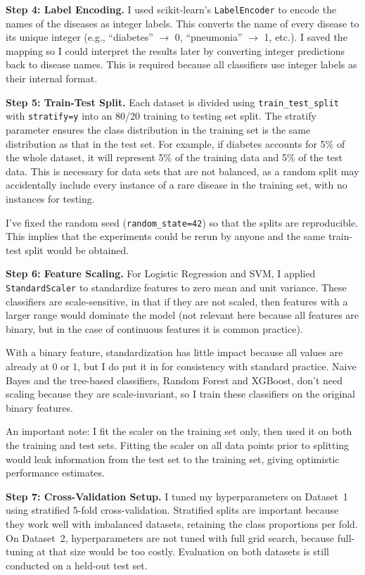 \textbf{Step 4: Label Encoding.} I used scikit-learn's \texttt{LabelEncoder} to encode the names of the diseases as integer labels. This converts the name of every disease to its unique integer (e.g., ``diabetes'' $\rightarrow$ 0, ``pneumonia'' $\rightarrow$ 1, etc.). I saved the mapping so I could interpret the results later by converting integer predictions back to disease names. This is required because all classifiers use integer labels as their internal format.

\textbf{Step 5: Train-Test Split.} Each dataset is divided using \texttt{train\_test\_split} with \texttt{stratify=y} into an 80/20 training to testing set split. The stratify parameter ensures the class distribution in the training set is the same distribution as that in the test set. For example, if diabetes accounts for 5\% of the whole dataset, it will represent 5\% of the training data and 5\% of the test data. This is necessary for data sets that are not balanced, as a random split may accidentally include every instance of a rare disease in the training set, with no instances for testing.

I've fixed the random seed (\texttt{random\_state=42}) so that the splits are reproducible. This implies that the experiments could be rerun by anyone and the same train-test split would be obtained.

\textbf{Step 6: Feature Scaling.} For Logistic Regression and SVM, I applied \texttt{StandardScaler} to standardize features to zero mean and unit variance. These classifiers are scale-sensitive, in that if they are not scaled, then features with a larger range would dominate the model (not relevant here because all features are binary, but in the case of continuous features it is common practice).

With a binary feature, standardization has little impact because all values are already at 0 or 1, but I do put it in for consistency with standard practice. Naive Bayes and the tree-based classifiers, Random Forest and XGBoost, don't need scaling because they are scale-invariant, so I train these classifiers on the original binary features.

An important note: I fit the scaler on the training set only, then used it on both the training and test sets. Fitting the scaler on all data points prior to splitting would leak information from the test set to the training set, giving optimistic performance estimates.

\textbf{Step 7: Cross-Validation Setup.} I tuned my hyperparameters on Dataset~1 using stratified 5-fold cross-validation. Stratified splits are important because they work well with imbalanced datasets, retaining the class proportions per fold. On Dataset~2, hyperparameters are not tuned with full grid search, because full-tuning at that size would be too costly. Evaluation on both datasets is still conducted on a held-out test set.

